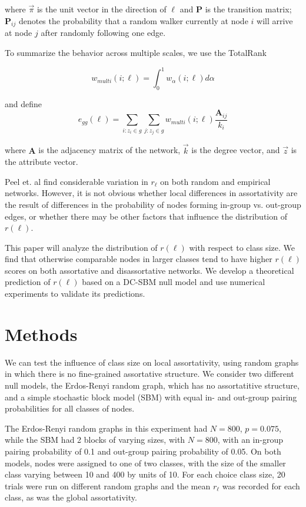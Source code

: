\documentclass[12pt]{article}
\begin{document}
where $\vec{\pi}$ is the unit vector in the direction of $\ell$ and $\mathbf{P}$ is the transition matrix; $\mathbf{P}_{ij}$ denotes the probability that a random walker currently at node $i$ will arrive at node $j$ after randomly following one edge.

To summarize the behavior across multiple scales, we use the TotalRank

\begin{equation}
  w_{multi}(i; \ell) = \int_0^1 w_\alpha(i; \ell) d\alpha
\end{equation} \cite{boldi:2005} \cite{Peel:2018}

and define
\begin{equation}
  e_{gg}(\ell) = \sum_{i: z_i \in g} \sum_{j: z_j \in g} w_{multi}(i; \ell) \frac{\mathbf{A}_{ij}}{k_i}
\end{equation} \cite{Peel:2018}

where $\mathbf{A}$ is the adjacency matrix of the network, $\vec{k}$ is the degree vector, and $\vec{z}$ is the attribute vector.

Peel et. al find considerable variation in $r_\ell$ on both random and empirical networks.  However, it is not obvious whether local differences in assortativity are the result of differences in the probability of nodes forming in-group vs. out-group edges, or whether there may be other factors that influence the distribution of $r(\ell)$.

This paper will analyze the distribution of $r(\ell)$ with respect to class size.  We find that otherwise comparable nodes in larger classes tend to have higher $r(\ell)$ scores on both assortative and disassortative networks.  We develop a theoretical prediction of $r(\ell)$ based on a DC-SBM null model and use numerical experiments to validate its predictions.

\section{Methods}
We can test the influence of class size on local assortativity, using random graphs in which there is no fine-grained assortative structure.  We consider two different null models, the Erdos-Renyi random graph, which has no assortatitive structure, and a simple stochastic block model (SBM) with equal in- and out-group pairing probabilities for all classes of nodes.

The Erdos-Renyi random graphs in this experiment had $N=800$, $p=0.075$, while the SBM had 2 blocks of varying sizes, with $N=800$, with an in-group pairing probability of 0.1 and out-group pairing probability of 0.05.  On both models, nodes were assigned to one of two classes, with the size of the smaller class varying between 10 and 400 by units of 10.  For each choice class size, 20 trials were run on different random graphs and the mean $r_\ell$ was recorded for each class, as was the global assortativity.
\end{document}

